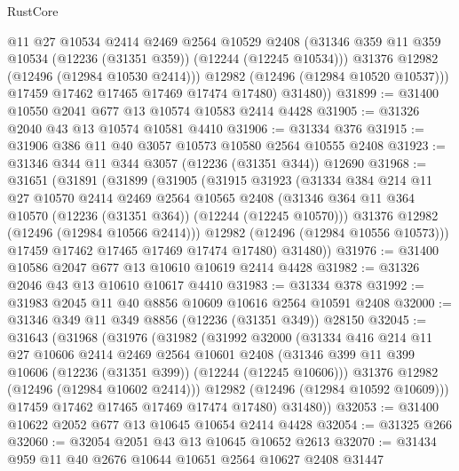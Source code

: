 \begin{lexlean}{RustCore}
\begin{coremodule}
              @11
              @27
              @10534
              @2414
              @2469
              @2564
              @10529
              @2408
              (@31346 @359 @11 @359 @10534 (@12236 (@31351 @359)) (@12244 (@12245 @10534)))
              @31376
              @12982
              (@12496 (@12984 @10530 @2414)))
            @12982
            (@12496 (@12984 @10520 @10537)))
          @17459
          @17462
          @17465
          @17469
          @17474
          @17480)
        @31480))
@31899 := @31400 @10550 @2041 @677 @13 @10574 @10583 @2414 @4428
@31905 := @31326 @2040 @43 @13 @10574 @10581 @4410
@31906 := @31334 @376
@31915 := @31906 @386 @11 @40 @3057 @10573 @10580 @2564 @10555 @2408
@31923 := @31346 @344 @11 @344 @3057 (@12236 (@31351 @344)) @12690
@31968 := @31651
    (@31891
      (@31899
        (@31905
          (@31915
            @31923
            (@31334
              @384
              @214
              @11
              @27
              @10570
              @2414
              @2469
              @2564
              @10565
              @2408
              (@31346 @364 @11 @364 @10570 (@12236 (@31351 @364)) (@12244 (@12245 @10570)))
              @31376
              @12982
              (@12496 (@12984 @10566 @2414)))
            @12982
            (@12496 (@12984 @10556 @10573)))
          @17459
          @17462
          @17465
          @17469
          @17474
          @17480)
        @31480))
@31976 := @31400 @10586 @2047 @677 @13 @10610 @10619 @2414 @4428
@31982 := @31326 @2046 @43 @13 @10610 @10617 @4410
@31983 := @31334 @378
@31992 := @31983 @2045 @11 @40 @8856 @10609 @10616 @2564 @10591 @2408
@32000 := @31346 @349 @11 @349 @8856 (@12236 (@31351 @349)) @28150
@32045 := @31643
    (@31968
      (@31976
        (@31982
          (@31992
            @32000
            (@31334
              @416
              @214
              @11
              @27
              @10606
              @2414
              @2469
              @2564
              @10601
              @2408
              (@31346 @399 @11 @399 @10606 (@12236 (@31351 @399)) (@12244 (@12245 @10606)))
              @31376
              @12982
              (@12496 (@12984 @10602 @2414)))
            @12982
            (@12496 (@12984 @10592 @10609)))
          @17459
          @17462
          @17465
          @17469
          @17474
          @17480)
        @31480))
@32053 := @31400 @10622 @2052 @677 @13 @10645 @10654 @2414 @4428
@32054 := @31325 @266
@32060 := @32054 @2051 @43 @13 @10645 @10652 @2613
@32070 := @31434 @959 @11 @40 @2676 @10644 @10651 @2564 @10627 @2408 @31447

\end{coremodule}
\end{lexlean}
